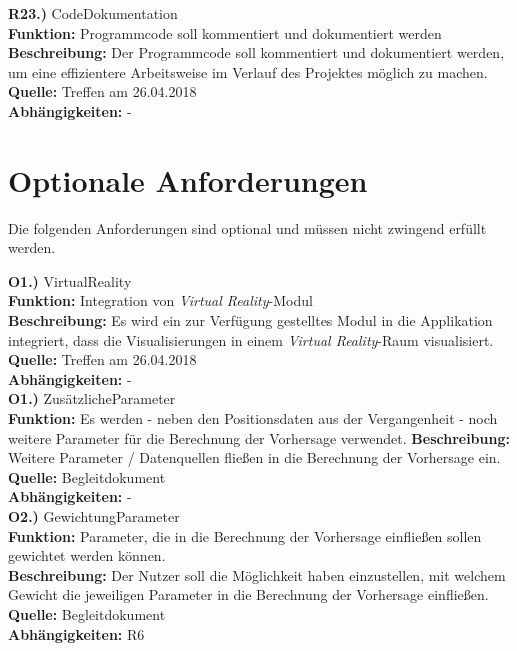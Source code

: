\documentclass[12pt]{article} %
\begin{document}
\textbf{R23.)} CodeDokumentation \\
\textbf{Funktion:} Programmcode soll kommentiert und dokumentiert werden \\
\textbf{Beschreibung:} Der Programmcode soll kommentiert und dokumentiert werden, um eine effizientere Arbeitsweise im Verlauf des Projektes möglich zu machen. \\
\textbf{Quelle:} Treffen am 26.04.2018 \\
\textbf{Abhängigkeiten:} - \\

 \section{Optionale Anforderungen} \label{optionale_anforderungen}

 Die folgenden Anforderungen sind optional und müssen nicht zwingend erfüllt werden.

\textbf{O1.)} VirtualReality \\
\textbf{Funktion:} Integration von \textit{Virtual Reality}-Modul \\
\textbf{Beschreibung:} Es wird ein zur Verfügung gestelltes Modul in die Applikation integriert, dass die Visualisierungen in einem \textit{Virtual Reality}-Raum visualisiert. \\
\textbf{Quelle:} Treffen am 26.04.2018 \\
\textbf{Abhängigkeiten:} - \\

\textbf{O1.)} ZusätzlicheParameter \\
\textbf{Funktion:} Es werden - neben den Positionsdaten aus der Vergangenheit - noch weitere Parameter für die Berechnung der Vorhersage verwendet.
\textbf{Beschreibung:} Weitere Parameter / Datenquellen fließen in die Berechnung der Vorhersage ein. \\
\textbf{Quelle:} Begleitdokument \\
\textbf{Abhängigkeiten:} - \\

\textbf{O2.)} GewichtungParameter \\
\textbf{Funktion:} Parameter, die in die Berechnung der Vorhersage einfließen sollen gewichtet werden können. \\
\textbf{Beschreibung:} Der Nutzer soll die Möglichkeit haben einzustellen, mit welchem Gewicht die jeweiligen Parameter in die Berechnung der Vorhersage einfließen.\\
\textbf{Quelle:} Begleitdokument \\
\textbf{Abhängigkeiten:} R6 \\
\end{document}
